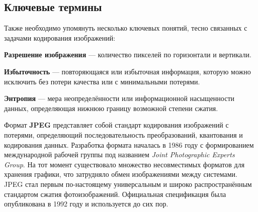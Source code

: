 \subsection*{Ключевые термины}

Также необходимо упомянуть несколько ключевых понятий, тесно связанных с задачами кодирования изображений:

\textbf{Разрешение изображения} — количество пикселей по горизонтали и вертикали.

\textbf{Избыточность} — повторяющаяся или избыточная информация, которую можно исключить без потери качества или с минимальными потерями.

\textbf{Энтропия} — мера неопределённости или информационной насыщенности данных, определяющая нижнюю границу возможной степени сжатия.

Формат \textbf{JPEG} представляет собой стандарт кодирования изображений с потерями, определяющий последовательность преобразований, квантования и кодирования данных. 
Разработка формата началась в 1986 году с формированием международной рабочей группы под названием \emph{Joint Photographic Experts Group}. 
На тот момент существовало множество несовместимых форматов для хранения графики, что затрудняло обмен изображениями между системами. 
JPEG стал первым по-настоящему универсальным и широко распространённым стандартом сжатия фотоизображений. 
Официальная спецификация была опубликована в 1992 году и используется до сих пор.